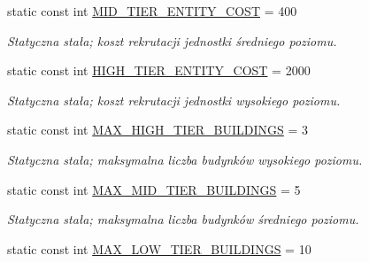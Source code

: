 \begin{DoxyCompactItemize}
\mbox{\label{classmodel_1_1Castle_acccacb70864e05f2c299abefa91df555}} 
static const int \hyperlink{classmodel_1_1Castle_acccacb70864e05f2c299abefa91df555}{M\+I\+D\+\_\+\+T\+I\+E\+R\+\_\+\+E\+N\+T\+I\+T\+Y\+\_\+\+C\+O\+ST} = 400
\begin{DoxyCompactList}\small\item\em Statyczna stała; koszt rekrutacji jednostki średniego poziomu. \end{DoxyCompactList}\item 
\mbox{\label{classmodel_1_1Castle_ac14c39feb4b10c1b5e03db76f26cabd2}} 
static const int \hyperlink{classmodel_1_1Castle_ac14c39feb4b10c1b5e03db76f26cabd2}{H\+I\+G\+H\+\_\+\+T\+I\+E\+R\+\_\+\+E\+N\+T\+I\+T\+Y\+\_\+\+C\+O\+ST} = 2000
\begin{DoxyCompactList}\small\item\em Statyczna stała; koszt rekrutacji jednostki wysokiego poziomu. \end{DoxyCompactList}\item 
\mbox{\label{classmodel_1_1Castle_a78afd159a8925f53cd895df7394dc1f2}} 
static const int \hyperlink{classmodel_1_1Castle_a78afd159a8925f53cd895df7394dc1f2}{M\+A\+X\+\_\+\+H\+I\+G\+H\+\_\+\+T\+I\+E\+R\+\_\+\+B\+U\+I\+L\+D\+I\+N\+GS} = 3
\begin{DoxyCompactList}\small\item\em Statyczna stała; maksymalna liczba budynków wysokiego poziomu. \end{DoxyCompactList}\item 
\mbox{\label{classmodel_1_1Castle_a343dfe0538d36cf80ab632f5f6221eb2}} 
static const int \hyperlink{classmodel_1_1Castle_a343dfe0538d36cf80ab632f5f6221eb2}{M\+A\+X\+\_\+\+M\+I\+D\+\_\+\+T\+I\+E\+R\+\_\+\+B\+U\+I\+L\+D\+I\+N\+GS} = 5
\begin{DoxyCompactList}\small\item\em Statyczna stała; maksymalna liczba budynków średniego poziomu. \end{DoxyCompactList}\item 
\mbox{\label{classmodel_1_1Castle_aff52e7e4d26f5062f1943a10a8b753d3}} 
static const int \hyperlink{classmodel_1_1Castle_aff52e7e4d26f5062f1943a10a8b753d3}{M\+A\+X\+\_\+\+L\+O\+W\+\_\+\+T\+I\+E\+R\+\_\+\+B\+U\+I\+L\+D\+I\+N\+GS} = 10

\end{DoxyCompactItemize}
